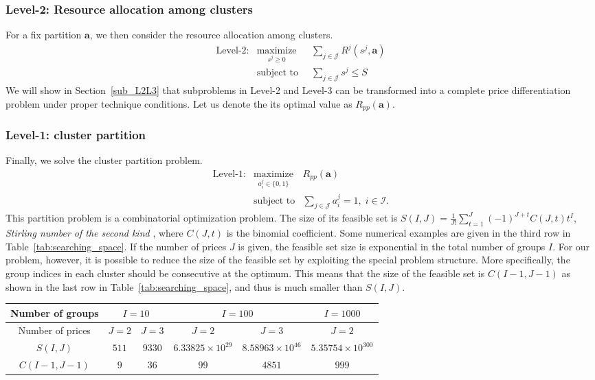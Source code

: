 \documentclass[twocolumn,10pt,twosided]{IEEEtran}
\begin{document}
\subsubsection{Level-2: Resource allocation among clusters} For a fix partition $\boldsymbol{a}$, we then consider the resource allocation among clusters.
\begin{eqnarray*}
  \text{Level-2:} & \underset{ s^j\ge 0}{\text{maximize}}\;\; &\sum_{j\in \mathcal{J}} R^j(s^j,\boldsymbol{a})  \nonumber\\
    &\text{subject to}\;\; & \sum\limits_{j\in \mathcal{J}} s^j \le S \label{con:resource_2}
\end{eqnarray*}
We will show in Section~\ref{sub_L2L3} that subproblems in Level-2 and Level-3 can be transformed into a complete price differentiation problem under proper technique conditions. Let us denote the its optimal value as $R_{pp}(\boldsymbol{a})$.

\subsubsection{Level-1: cluster partition} Finally, we solve the cluster partition problem.
\begin{eqnarray*}
   \text{Level-1:} & \underset{a_i^j\in\{0,1\}} {\text{maximize}}& R_{pp}(\boldsymbol{a})  \nonumber\\
    &\text{subject to} &\sum_{j\in\mathcal{J}}a_{i}^{j}=1,\; i\in \mathcal{I}.
\end{eqnarray*}
This partition problem is a combinatorial optimization problem.
The size of its feasible set is $S(I,J)=\frac{1}{J!}\sum\limits_{t=1}^{J}(-1)^{J+t}C(J,t)t^I$, \emph{Stirling number of the second kind}
 \cite[Chap.13]{van2001course}, where $C(J,t)$ is the binomial coefficient. Some numerical examples are given in the third row in Table~\ref{tab:searching_space}. If the number of prices $J$ is given, the feasible set size is exponential in the total number of groups $I$. For our problem, however, it is possible to reduce the size of the feasible set by exploiting the special problem structure. More specifically, the group indices in each cluster should be consecutive at the optimum. This means that the size of the feasible set is $C(I-1,J-1)$  as shown in the last row in Table~\ref{tab:searching_space}, and thus is much smaller than $S(I,J)$.

\begin{table*}
\caption{Numerical examples for feasible set size of the partition problem in Level-1}
\label{tab:searching_space} \centering
\begin{tabular}{c|c|c|c|c|c}
\hline
Number of groups &\multicolumn{2}{|c|}{$I=10$}&\multicolumn{2}{|c|}{$I=100$}&{$I=1000$}\\
\hline
Number of prices &$J=2$ & $J=3$&$J=2$&$J=3$&$J=2$\\
\hline
$S(I,J)$&$511$&$9330$&$6.33825\times 10^{29}$&$8.58963\times 10^{46}$&$5.35754\times 10^{300}$\\
\hline
$C(I-1,J-1)$&$9$&$36$&$99$&$4851$&$999$\\
\hline
\end{tabular}
\end{table*}
\end{document}
